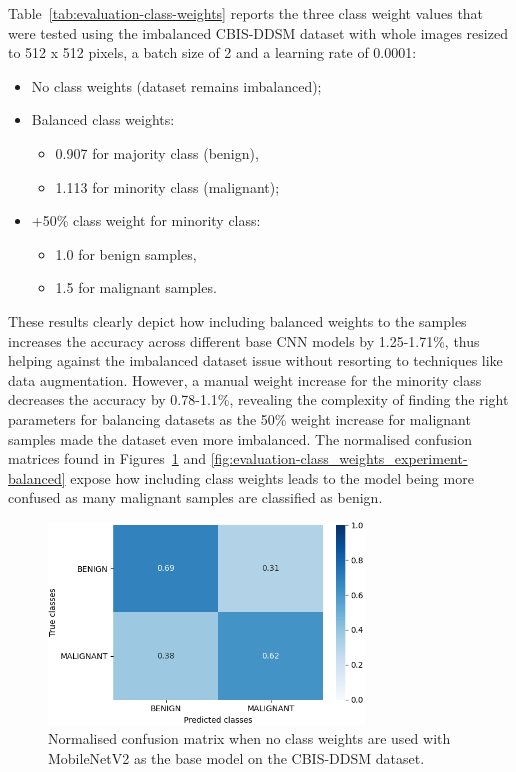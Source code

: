 Table~\ref{tab:evaluation-class-weights} reports the three class weight values that were tested using the imbalanced CBIS-DDSM dataset with whole images resized to 512 x 512 pixels, a batch size of 2 and a learning rate of 0.0001:
\begin{itemize}
    \item No class weights (dataset remains imbalanced);
    \item Balanced class weights:
    \begin{itemize}
        \item 0.907 for majority class (benign),
        \item 1.113 for minority class (malignant);
    \end{itemize}
    \item +50\% class weight for minority class:
    \begin{itemize}
        \item 1.0 for benign samples,
        \item 1.5 for malignant samples.
    \end{itemize}
\end{itemize}



These results clearly depict how including balanced weights to the samples increases the accuracy across different base CNN models by 1.25-1.71\%, thus helping against the imbalanced dataset issue without resorting to techniques like data augmentation. However, a manual weight increase for the minority class decreases the accuracy by 0.78-1.1\%, revealing the complexity of finding the right parameters for balancing datasets as the 50\% weight increase for malignant samples made the dataset even more imbalanced. The normalised confusion matrices found in Figures~\ref{fig:evaluation-class_weights_experiment-none} and \ref{fig:evaluation-class_weights_experiment-balanced} expose how including class weights leads to the model being more confused as many malignant samples are classified as benign.

\begin{figure}[H]
\centerline{\includegraphics[width=0.75\textwidth]{figures/evaluation/class_weights_experiment/none.png}}
\caption{\label{fig:evaluation-class_weights_experiment-none}Normalised confusion matrix when no class weights are used with MobileNetV2 as the base model on the CBIS-DDSM dataset.}
\end{figure}

